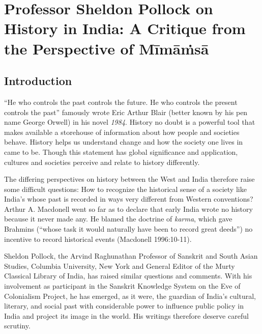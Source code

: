 
\chapter{Professor Sheldon Pollock on History in India: A Critique from the Perspective of Mīmāṁsā}\label{chapter2}



\section*{Introduction}

“He who controls the past controls the future. He who controls the present controls the past” famously wrote Eric Arthur Blair (better known by his pen name George Orwell) in his novel \textit{1984}. History no doubt is a powerful tool that makes available a storehouse of information about how people and societies behave. History helps us understand change and how the society one lives in came to be. Though this statement has global significance and application, cultures and societies perceive and relate to history differently.

The differing perspectives on history between the West and India therefore raise some difficult questions: How to recognize the historical sense of a society like India’s whose past is recorded in ways very different from Western conventions? Arthur A. Macdonell went so far as to declare that early India wrote no history because it never made any. He blamed the doctrine of \textit{karma}, which gave Brahmins (“whose task it would naturally have been to record great deeds”) no incentive to record historical events (Macdonell 1996:10-11).

\newpage

Sheldon Pollock, the Arvind Raghunathan Professor of Sanskrit and South Asian Studies, Columbia University, New York and General Editor of the Murty Classical Library of India, has raised similar questions and comments. With his involvement as participant in the Sanskrit Knowledge System on the Eve of Colonialism Project, he has emerged, as it were, the guardian of India’s cultural, literary, and social past with considerable power to influence public policy in India and project its image in the world. His writings therefore deserve careful scrutiny.

